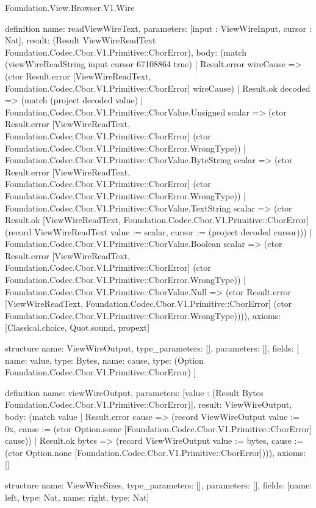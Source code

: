 \begin{lexlean}{Foundation.View.Browser.V1.Wire}
\begin{semanticmodule}
definition{
  name: readViewWireText,
  parameters: [input : ViewWireInput, cursor : Nat],
  result: (Result ViewWireReadText Foundation.Codec.Cbor.V1.Primitive::CborError),
  body: (match (viewWireReadString input cursor 67108864 true)
    | Result.error wireCause => (ctor Result.error [ViewWireReadText, Foundation.Codec.Cbor.V1.Primitive::CborError] wireCause)
    | Result.ok decoded => (match (project decoded value)
      | Foundation.Codec.Cbor.V1.Primitive::CborValue.Unsigned scalar => (ctor Result.error [ViewWireReadText, Foundation.Codec.Cbor.V1.Primitive::CborError] (ctor Foundation.Codec.Cbor.V1.Primitive::CborError.WrongType))
      | Foundation.Codec.Cbor.V1.Primitive::CborValue.ByteString scalar => (ctor Result.error [ViewWireReadText, Foundation.Codec.Cbor.V1.Primitive::CborError] (ctor Foundation.Codec.Cbor.V1.Primitive::CborError.WrongType))
      | Foundation.Codec.Cbor.V1.Primitive::CborValue.TextString scalar => (ctor Result.ok [ViewWireReadText, Foundation.Codec.Cbor.V1.Primitive::CborError] (record ViewWireReadText {value := scalar, cursor := (project decoded cursor)}))
      | Foundation.Codec.Cbor.V1.Primitive::CborValue.Boolean scalar => (ctor Result.error [ViewWireReadText, Foundation.Codec.Cbor.V1.Primitive::CborError] (ctor Foundation.Codec.Cbor.V1.Primitive::CborError.WrongType))
      | Foundation.Codec.Cbor.V1.Primitive::CborValue.Null => (ctor Result.error [ViewWireReadText, Foundation.Codec.Cbor.V1.Primitive::CborError] (ctor Foundation.Codec.Cbor.V1.Primitive::CborError.WrongType)))),
  axioms: [Classical.choice, Quot.sound, propext]
}

structure{
  name: ViewWireOutput,
  type_parameters: [],
  parameters: [],
  fields: [
    {name: value, type: Bytes},
    {name: cause, type: (Option Foundation.Codec.Cbor.V1.Primitive::CborError)}
  ]
}

definition{
  name: viewWireOutput,
  parameters: [value : (Result Bytes Foundation.Codec.Cbor.V1.Primitive::CborError)],
  result: ViewWireOutput,
  body: (match value
    | Result.error cause => (record ViewWireOutput {value := 0x, cause := (ctor Option.some [Foundation.Codec.Cbor.V1.Primitive::CborError] cause)})
    | Result.ok bytes => (record ViewWireOutput {value := bytes, cause := (ctor Option.none [Foundation.Codec.Cbor.V1.Primitive::CborError])})),
  axioms: []
}

structure{
  name: ViewWireSizes,
  type_parameters: [],
  parameters: [],
  fields: [{name: left, type: Nat}, {name: right, type: Nat}]
}


\end{semanticmodule}
\end{lexlean}
